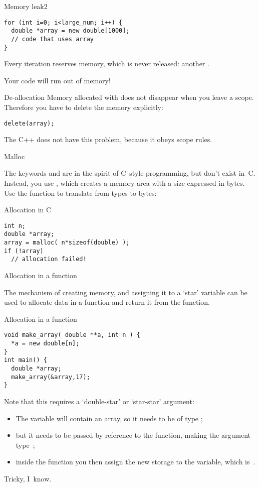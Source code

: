 \begin{block}{Memory leak2}
  \label{sl:leak2}
\begin{verbatim}
for (int i=0; i<large_num; i++) {
  double *array = new double[1000];
  // code that uses array
}
\end{verbatim}
  Every iteration reserves memory, which is never released:
  another .

  Your code will run out of memory!
\end{block}

\begin{block}{De-allocation}
  \label{sl:c-array-del}
  Memory allocated with  does not disappear when you leave a
  scope. Therefore you have to delete the memory explicitly:
\begin{verbatim}
delete(array);
\end{verbatim}
The C++  does not have this problem, because it obeys scope rules.
\end{block}

 {Malloc}

The keywords  and  are in the spirit of C~style
programming, but don't exist in~C. Instead, you use
, which creates a memory area with a size
expressed in bytes. Use the function  to translate
from types to bytes:

\begin{block}{Allocation in C}
\begin{verbatim}
int n;
double *array;
array = malloc( n*sizeof(double) );
if (!array)
  // allocation failed!
\end{verbatim}
\end{block}

 {Allocation in a function}

The mechanism of creating memory, and assigning it to a `star'
variable
can be used to allocate data in a function and
return it from the function.

\begin{block}{Allocation in a function}
\begin{verbatim}
void make_array( double **a, int n ) {
  *a = new double[n];
}
int main() {
  double *array;
  make_array(&array,17);
}
\end{verbatim}
\end{block}

Note that this requires a `double-star' or `star-star' argument:
\begin{itemize}
\item The variable  will contain an array, so it needs to be of
  type ;
\item but it needs to be passed by reference to the function, making
  the argument type~;
\item inside the function you then assign the new storage to the
   variable, which is~.
\end{itemize}
Tricky, I~know.

